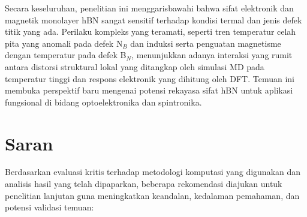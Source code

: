 Secara keseluruhan, penelitian ini menggarisbawahi bahwa sifat elektronik dan magnetik monolayer hBN sangat sensitif terhadap kondisi termal dan jenis defek titik yang ada. Perilaku kompleks yang teramati, seperti tren temperatur celah pita yang anomali pada defek N$_B$ dan induksi serta penguatan magnetisme dengan temperatur pada defek B$_N$, menunjukkan adanya interaksi yang rumit antara distorsi struktural lokal yang ditangkap oleh simulasi MD pada temperatur tinggi dan respons elektronik yang dihitung oleh DFT. Temuan ini membuka perspektif baru mengenai potensi rekayasa sifat hBN untuk aplikasi fungsional di bidang optoelektronika dan spintronika.

\section{Saran}
\label{sec:saran}
Berdasarkan evaluasi kritis terhadap metodologi komputasi yang digunakan dan analisis hasil yang telah dipaparkan, beberapa rekomendasi diajukan untuk penelitian lanjutan guna meningkatkan keandalan, kedalaman pemahaman, dan potensi validasi temuan:

